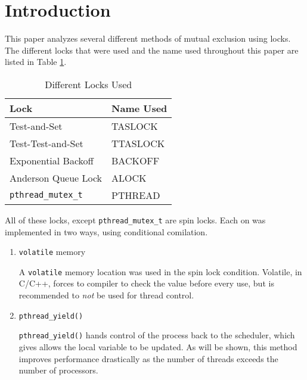 \section{Introduction}

This paper analyzes several different methods of mutual exclusion using locks.
The different locks that were used and the name used throughout this paper are listed in Table \ref{table:locks}.

\begin{table}[hp]
    \caption{Different Locks Used}
    \begin{center}
        \begin{tabular}{|l|l|}
            \hline Lock & Name Used \\
            \hline Test-and-Set & TASLOCK \\
            \hline Test-Test-and-Set & TTASLOCK \\
            \hline Exponential Backoff & BACKOFF \\
            \hline Anderson Queue Lock & ALOCK \\
            \hline \verb+pthread_mutex_t+ & PTHREAD \\
            \hline
        \end{tabular}
    \end{center}
    \label{table:locks}
\end{table}

All of these locks, except \verb+pthread_mutex_t+ are spin locks.
Each on was implemented in two ways, using conditional comilation.
\begin{enumerate}
    \item \verb+volatile+ memory

        A \verb+volatile+ memory location was used in the spin lock condition.
        Volatile, in C/C++, forces to compiler to check the value before every use, but is recommended to \emph{not} be used for thread control.
    \item \verb+pthread_yield()+

        \verb+pthread_yield()+ hands control of the process back to the scheduler, which gives allows the local variable to be updated.
        As will be shown, this method improves performance drastically as the number of threads exceeds the number of processors.
\end{enumerate}

